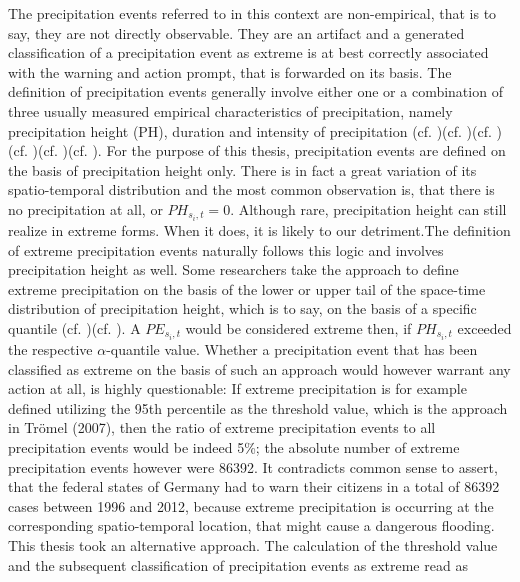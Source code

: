 \documentclass[
  12pt,
]{article}
\begin{document}
\begingroup
\justify

The precipitation events referred to in this context are non-empirical,
that is to say, they are not directly observable. They are an artifact
and a generated classification of a precipitation event as extreme is at
best correctly associated with the warning and action prompt, that is
forwarded on its basis. The definition of precipitation events generally
involve either one or a combination of three usually measured empirical
characteristics of precipitation, namely precipitation height (PH),
duration and intensity of precipitation (cf. \citet{Tromel.2007})(cf.
\citet{Keller.2014})(cf. \citet{Thieken.2016})(cf.
\citet{Kreibich.2017})(cf. \citet{Wagenaar.2018})(cf.
\citet{Gimeno.2022}). For the purpose of this thesis, precipitation
events are defined on the basis of precipitation height only. There is
in fact a great variation of its spatio-temporal distribution and the
most common observation is, that there is no precipitation at all, or
\(PH_{s_{i},t}=0\). Although rare, precipitation height can still
realize in extreme forms. When it does, it is likely to our
detriment.\newline The definition of extreme precipitation events
naturally follows this logic and involves precipitation height as well.
Some researchers take the approach to define extreme precipitation on
the basis of the lower or upper tail of the space-time distribution of
precipitation height, which is to say, on the basis of a specific
quantile (cf. \citet{Tromel.2007})(cf. \citet{Gimeno.2022}). A
\(PE_{s_{i},t}\) would be considered extreme then, if \(PH_{s_{i},t}\)
exceeded the respective \(\alpha\)-quantile value. Whether a
precipitation event that has been classified as extreme on the basis of
such an approach would however warrant any action at all, is highly
questionable: If extreme precipitation is for example defined utilizing
the 95th percentile as the threshold value, which is the approach in
Trömel (2007), then the ratio of extreme precipitation events to all
precipitation events would be indeed 5\%; the absolute number of extreme
precipitation events however were 86392. It contradicts common sense to
assert, that the federal states of Germany had to warn their citizens in
a total of 86392 cases between 1996 and 2012, because extreme
precipitation is occurring at the corresponding spatio-temporal
location, that might cause a dangerous flooding. This thesis took an
alternative approach. The calculation of the threshold value and the
subsequent classification of precipitation events as extreme read as
\end{document}
